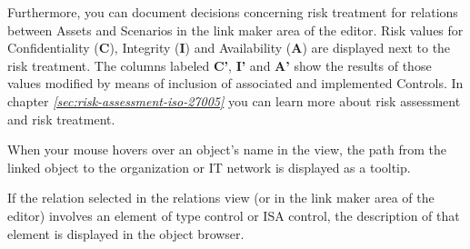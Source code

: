 \documentclass[a4paper,10pt]{book}
\begin{document}
Furthermore, you can document decisions concerning risk treatment for relations
between Assets and Scenarios in the link maker area of the editor. Risk values
for Confidentiality (\textbf{C}), Integrity (\textbf{I}) and Availability
(\textbf{A}) are displayed next to the risk treatment. The columns labeled
\textbf{C'}, \textbf{I'} and \textbf{A'} show the results of those values
modified by means of inclusion of associated and implemented Controls. In
chapter {\em \ref{sec:risk-assessment-iso-27005}
} you can learn more about risk
assessment and risk treatment.

When your mouse hovers over an object’s name in the view, the path from the
linked object to the organization or IT network is displayed as a tooltip.

If the relation selected in the relations view (or in the link maker area of the
editor) involves an element of type control or ISA control, the description of
that element is displayed in the object browser.
\end{document}
